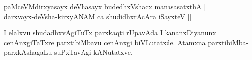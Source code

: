 \begin{shloka}
paMceVMdirxyasayx deVhasayx budedhxVshacx manasasatxthA |\label{139b}\\
darxvayx-deVsha-kirxyANAM ca shudidhxrAcAra iSayxteV ||
\end{shloka}

I elalxvu shudadhxvAgiTuTx parxkaqti rUpavAda I kananxDiyanunx cenAnxgiTaTxre parxtibiMbavu cenAnxgi biVLutatxde. Atamxna parxtibiMba-parxkAshagaLu suPxTavAgi kANutatxve.

